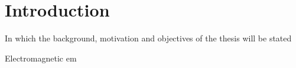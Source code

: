 %
\chapter{Introduction}
\label{ch::chapter1}

\begin{center}
  \begin{minipage}{0.5\textwidth}
    \begin{small}
      In which the background, motivation and objectives of the thesis will be stated
    \end{small}
  \end{minipage}
  \vspace{0.5cm}
\end{center}


Electromagnetic \gls{em}

